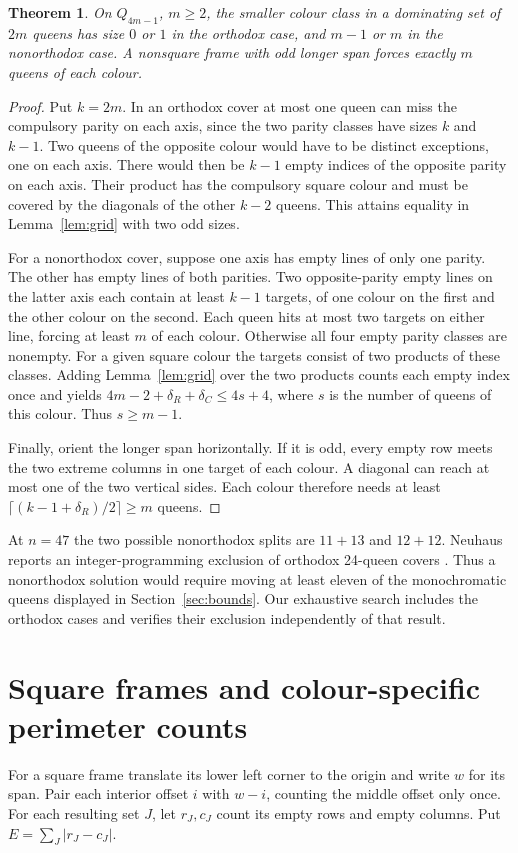 \documentclass[11pt]{article}
\newtheorem{theorem}{Theorem}[section]
\begin{document}
\begin{theorem}\label{thm:split}
On $Q_{4m-1}$, $m\ge2$, the smaller colour class in a dominating set of
$2m$ queens has size $0$ or $1$ in the orthodox case, and $m-1$ or $m$
in the nonorthodox case. A nonsquare frame with odd longer span forces
exactly $m$ queens of each colour.
\end{theorem}
\begin{proof}
Put $k=2m$. In an orthodox cover at most one queen can miss the compulsory
parity on each axis, since the two parity classes have sizes $k$ and
$k-1$. Two queens of the opposite colour would have to be distinct
exceptions, one on each axis. There would then be $k-1$ empty indices of
the opposite parity on each axis. Their product has the compulsory square
colour and must be covered by the diagonals of the other $k-2$ queens.
This attains equality in Lemma~\ref{lem:grid} with two odd sizes.

For a nonorthodox cover, suppose one axis has empty lines of only one
parity. The other has empty lines of both parities. Two opposite-parity
empty lines on the latter axis each contain at least $k-1$ targets, of
one colour on the first and the other colour on the second. Each queen
hits at most two targets on either line, forcing at least $m$ of each
colour. Otherwise all four empty parity classes are nonempty. For a
given square colour the targets consist of two products of these classes.
Adding Lemma~\ref{lem:grid} over the two products counts each empty
index once and yields $4m-2+\delta_R+\delta_C\le4s+4$, where $s$ is the
number of queens of this colour. Thus $s\ge m-1$.

Finally, orient the longer span horizontally. If it is odd, every empty
row meets the two extreme columns in one target of each colour. A diagonal
can reach at most one of the two vertical sides. Each colour therefore
needs at least $\lceil(k-1+\delta_R)/2\rceil\ge m$ queens.
\end{proof}

At $n=47$ the two possible nonorthodox splits are $11+13$ and $12+12$.
Neuhaus reports an integer-programming exclusion of orthodox 24-queen
covers \cite[\S3.6, p.~59]{Neuhaus}. Thus a nonorthodox solution would
require moving at least eleven of the monochromatic queens displayed in
Section~\ref{sec:bounds}. Our exhaustive search includes the orthodox
cases and verifies their exclusion independently of that result.

\section{Square frames and colour-specific perimeter counts}\label{sec:colour}
For a square frame translate its lower left corner to the origin and write
$w$ for its span. Pair each interior offset $i$ with $w-i$, counting the
middle offset only once. For each resulting set $J$, let $r_J,c_J$ count
its empty rows and empty columns. Put $E=\sum_J|r_J-c_J|$.
\end{document}
